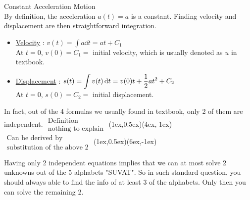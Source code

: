 \documentclass[class=article, crop=false, 12pt]{standalone}
\begin{document}
\begin{example} Constant Acceleration Motion \\

    By definition, the acceleration $a(t) = a$ is a constant. 
    Finding velocity and displacement are then straightforward integration.

    \begin{itemize}
        \item \ul{Velocity} : $v(t) = \displaystyle \int a \dd{t} = at + C_1$ \\[0.5em]
        At $t=0$, $v(0) = C_1 =$ initial velocity, which is usually denoted as $u$ in textbook.

        \item \ul{Displacement} : $s(t) = \displaystyle \int v(t) \dd{t} = v(0)t + \frac{1}{2} at^2 + C_2$ \\[0.5em]
        At $t=0$, $s(0) = C_2 =$ initial displacement.
    \end{itemize}
    
    In fact, out of the 4 formulas we usually found in textbook, only 2 of them are independent.
    {$\substack{\displaystyle\text{Definition}\\\displaystyle\text{nothing to explain}}$}
    {(1ex,0.5ex)}{(4ex,-1ex)}
    {$\substack{\displaystyle\text{Can be derived by}\\\displaystyle\text{substitution of the above 2}}$}
    {(1ex,0.5ex)}{(6ex,-1ex)}

    Having only 2 independent equations implies that we can at most solve 2 unknowns out of the 5 alphabets "SUVAT".
    So in such standard question, you should always able to find the info of at least 3 of the alphabets.
    Only then you can solve the remaining 2. 

\end{example}
\end{document}
